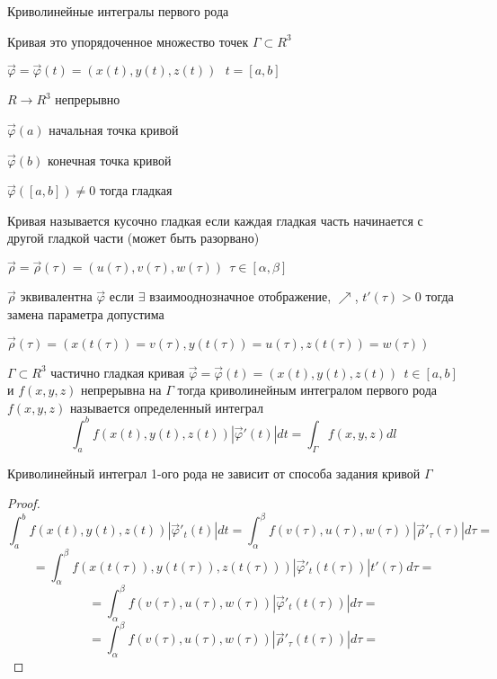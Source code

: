 \begin{title}[\Large]
  Криволинейные интегралы первого рода
\end{title}

\begin{block}[Кривая]
  Кривая это упорядоченное множество точек $\Gamma \subset R^3$

  $\vec \varphi = \vec \varphi(t) = (x(t), y(t), z(t)) ~~~ t = [a,b]$

  $R \to R^3$ непрерывно

  $\vec \varphi(a)$ начальная точка кривой

  $\vec \varphi(b)$ конечная точка кривой

  $\vec \varphi([a,b]) \not= 0$ тогда гладкая

  Кривая называется кусочно гладкая если каждая гладкая часть начинается с
  другой гладкой части (может быть разорвано)

  $\vec \rho = \vec \rho(\tau) = (u(\tau), v(\tau), w(\tau)) ~~
  \tau \in [\alpha, \beta]$

  $\vec \rho$ эквивалентна $\vec \varphi$ если $\exists$ взаимооднозначное
  отображение, $\nearrow$, $t'(\tau) > 0$ тогда замена параметра допустима

  $\vec \rho(\tau) = (x(t(\tau)) = v(\tau), y(t(\tau)) = u(\tau),
  z(t(\tau)) = w(\tau))$
\end{block}

\begin{define}
  $\Gamma \subset R^3$ частично гладкая кривая $\vec \varphi = \vec \varphi(t) =
  (x(t), y(t), z(t)) ~~ t \in [a,b]$ и $f(x,y,z)$ непрерывна на $\Gamma$ тогда
  криволинейным интегралом первого рода $f(x,y,z)$ называется определенный
  интеграл
  $$
  \int_a^b f(x(t), y(t), z(t))|\vec \varphi'(t)|dt =
  \int_{\Gamma} f(x,y,z) d l
  $$
\end{define}

\begin{theorem}
  Криволинейный интеграл 1-ого рода не зависит от способа задания кривой
  $\Gamma$
\end{theorem}

\begin{proof}
  $$
  \int_a^b f(x(t), y(t), z(t))|\vec \varphi'_t(t)|dt =
  \int_{\alpha}^{\beta} f(v(\tau), u(\tau), w(\tau))
  |\vec \rho'_{\tau}(\tau)|d\tau =
  $$
  $$
  = \int_{\alpha}^{\beta} f(x(t(\tau)), y(t(\tau)), z(t(\tau)))
  |\vec \varphi'_t(t(\tau))| t'(\tau)d\tau =
  $$
  $$
  = \int_{\alpha}^{\beta} f(v(\tau), u(\tau), w(\tau))
  |\vec \varphi'_t(t(\tau))| d\tau =
  $$
  $$
  = \int_{\alpha}^{\beta} f(v(\tau), u(\tau), w(\tau))
  |\vec \rho'_{\tau}(t(\tau))| d\tau =
  $$
\end{proof}

